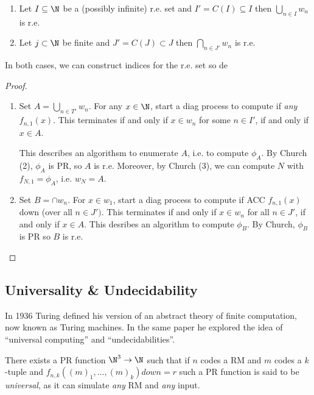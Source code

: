 \documentclass[a4paper]{article}
\begin{document}


\begin{theorem}\leavevmode
  \begin{enumerate}
\item Let \(I \subseteq \N\) be a (possibly infinite) r.e. set and \(I' =C(I) \subseteq I\) then \(\bigcup_{n\in I}w_n\) is r.e.
\item Let \(j \subset \N\) be finite and \(J' = C(J) \subset J\) then \(\bigcap_{n\in J'}w_n\) is r.e.
  \end{enumerate}
\end{theorem}

In both cases, we can construct indices for the r.e. set so de

\begin{proof}\leavevmode
  \begin{enumerate}
  \item Set \(A = \bigcup_{n\in T'}w_n\). For any \(x\in \N\), start a diag process to compute if \emph{any} \(f_{n,1}(x)\). This terminates if and only if \(x\in w_n\) for some \(n\in I'\), if and only if \(x \in A\).

  This describes an algorithsm to enumerate \(A\), i.e. to compute \(\phi_A\). By Church (2), \(\phi_A\) is PR, so \(A\) is r.e. Moreover, by Church (3), we can compute \(N\) with \(f_{N,1} = \phi_A\), i.e. \(w_N = A\).
\item Set \(B = \cap w_n\). For \(x\in w_1\), start a diag process to compute if ACC \(f_{n,1}(x)\) down (over all \(n\in J')\). This terminates if and only if \(x\in w_n\) for all \(n\in J'\), if and only if \(x\in A\).
  This desribes an algorithm to compute \(\phi_B\). By Church, \(\phi_B\) is PR so \(B\) is r.e. 
  \end{enumerate}
\end{proof}

\subsection{Universality \& Undecidability}

In 1936 Turing defined his version of an abstract theory of finite computation, now known as Turing machines. In the same paper he explored the idea of ``universal computing'' and ``undecidabilities''.

\begin{theorem}
  There exists a PR function \(\N^3\to \N\) such that if \(n\) codes a RM and \(m\) codes a \(k\)-tuple and \(f_{n,k}((m)_1,\dots,(m)_k) down = r\)
  such a PR function is said to be \emph{universal}, as it can simulate \emph{any} RM and \emph{any} input.
\end{theorem}
\end{document}
